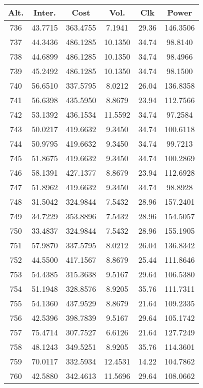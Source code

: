 \begin{center}
\begin{footnotesize}
\begin{tabular}{|c|ccccc|}
\hline
Alt. & Inter. & Cost & Vol. & Clk & Power\\
\hline
736 & 43.7715 & 363.4755 & 7.1941 & 29.36 & 146.3506 \\
737 & 44.3436 & 486.1285 & 10.1350 & 34.74 & 98.8140 \\
738 & 44.6899 & 486.1285 & 10.1350 & 34.74 & 98.4966 \\
739 & 45.2492 & 486.1285 & 10.1350 & 34.74 & 98.1500 \\
740 & 56.6510 & 337.5795 & 8.0212 & 26.04 & 136.8358 \\
741 & 56.6398 & 435.5950 & 8.8679 & 23.94 & 112.7566 \\
742 & 53.1392 & 436.1534 & 11.5592 & 34.74 & 97.2584 \\
743 & 50.0217 & 419.6632 & 9.3450 & 34.74 & 100.6118 \\
744 & 50.9795 & 419.6632 & 9.3450 & 34.74 & 99.7213 \\
745 & 51.8675 & 419.6632 & 9.3450 & 34.74 & 100.2869 \\
746 & 58.1391 & 427.1377 & 8.8679 & 23.94 & 112.6928 \\
747 & 51.8962 & 419.6632 & 9.3450 & 34.74 & 98.8928 \\
748 & 31.5042 & 324.9844 & 7.5432 & 28.96 & 157.2401 \\
749 & 34.7229 & 353.8896 & 7.5432 & 28.96 & 154.5057 \\
750 & 33.4837 & 324.9844 & 7.5432 & 28.96 & 155.1905 \\
751 & 57.9870 & 337.5795 & 8.0212 & 26.04 & 136.8342 \\
752 & 44.5500 & 417.1567 & 8.8679 & 25.44 & 111.8646 \\
753 & 54.4385 & 315.3638 & 9.5167 & 29.64 & 106.5380 \\
754 & 51.1948 & 328.8576 & 8.9205 & 35.76 & 111.7311 \\
755 & 54.1360 & 437.9529 & 8.8679 & 21.64 & 109.2335 \\
756 & 42.5396 & 398.7839 & 9.5167 & 29.64 & 105.1742 \\
757 & 75.4714 & 307.7527 & 6.6126 & 21.64 & 127.7249 \\
758 & 48.1243 & 349.5251 & 8.9205 & 35.76 & 114.3601 \\
759 & 70.0117 & 332.5934 & 12.4531 & 14.22 & 104.7862 \\
760 & 42.5880 & 342.4613 & 11.5696 & 29.64 & 108.0662 \\

\end{tabular}
\end{footnotesize}
\end{center}
